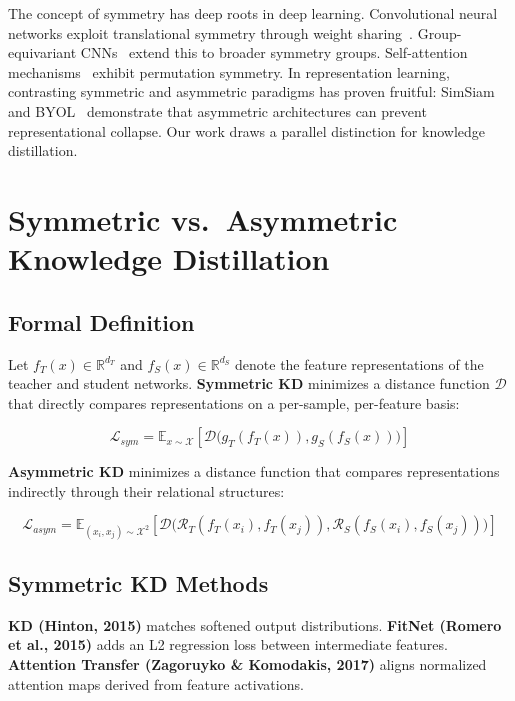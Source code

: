 \documentclass[symmetry,article,submit,moreauthors]{Definitions/mdpi}
\begin{document}
The concept of symmetry has deep roots in deep learning. Convolutional neural networks exploit translational symmetry through weight sharing~\cite{ref13}. Group-equivariant CNNs~\cite{ref14} extend this to broader symmetry groups. Self-attention mechanisms~\cite{ref15} exhibit permutation symmetry. In representation learning, contrasting symmetric and asymmetric paradigms has proven fruitful: SimSiam~\cite{ref16} and BYOL~\cite{ref17} demonstrate that asymmetric architectures can prevent representational collapse. Our work draws a parallel distinction for knowledge distillation.

\section{Symmetric vs.\ Asymmetric Knowledge Distillation}

\subsection{Formal Definition}

Let $f_T(x) \in \mathbb{R}^{d_T}$ and $f_S(x) \in \mathbb{R}^{d_S}$ denote the feature representations of the teacher and student networks. \textbf{Symmetric KD} minimizes a distance function $\mathcal{D}$ that directly compares representations on a per-sample, per-feature basis:

\begin{equation}
\mathcal{L}_{sym} = \mathbb{E}_{x \sim \mathcal{X}} \left[ \mathcal{D}\big(g_T(f_T(x)), g_S(f_S(x))\big) \right]
\end{equation}

\textbf{Asymmetric KD} minimizes a distance function that compares representations indirectly through their relational structures:

\begin{equation}
\mathcal{L}_{asym} = \mathbb{E}_{(x_i, x_j) \sim \mathcal{X}^2} \left[ \mathcal{D}\big(\mathcal{R}_T(f_T(x_i), f_T(x_j)), \mathcal{R}_S(f_S(x_i), f_S(x_j))\big) \right]
\end{equation}

\subsection{Symmetric KD Methods}

\textbf{KD (Hinton, 2015)} matches softened output distributions. \textbf{FitNet (Romero et al., 2015)} adds an L2 regression loss between intermediate features. \textbf{Attention Transfer (Zagoruyko \& Komodakis, 2017)} aligns normalized attention maps derived from feature activations.
\end{document}
